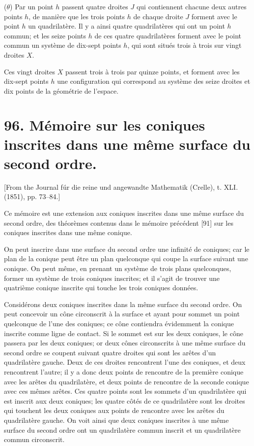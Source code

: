\documentclass[11pt,a4paper]{book}
\begin{document}
($\theta$) Par un point $h$ passent quatre droites $J$ qui contiennent chacune deux autres points $h$, de mani\`{e}re que les trois points $h$ de chaque droite $J$ forment avec le point $h$ un quadrilat\`{e}re. Il y a ainsi quatre quadrilat\`{e}res qui ont un point $h$ commun; et les seize points $h$ de ces quatre quadrilat\`{e}res forment avec le point commun un syst\`{e}me de dix-sept points $h$, qui sont situ\'{e}s trois \`{a} trois sur vingt droites $X$.

Ces vingt droites $X$ passent trois \`{a} trois par quinze points, et forment avec les dix-sept points $h$ une configuration qui correspond au syst\`{e}me des seize droites et dix points de la g\'{e}om\'{e}trie de l'espace.

\newpage

\section*{96. M\'{e}moire sur les coniques inscrites dans une m\^{e}me surface du second ordre.}

[From the Journal f\'{u}r die reine und angewandte Mathematik (Crelle), t. XLI. (1851), pp. 73--84.]

Ce m\'{e}moire est une extension aux coniques inscrites dans une m\^{e}me surface du second ordre, des th\'{e}or\`{e}mes contenus dans le m\'{e}moire pr\'{e}c\'{e}dent [91] sur les coniques inscrites dans une m\^{e}me conique.

On peut inscrire dans une surface du second ordre une infinit\'{e} de coniques; car le plan de la conique peut \^{e}tre un plan quelconque qui coupe la surface suivant une conique. On peut m\^{e}me, en prenant un syst\`{e}me de trois plans quelconques, former un syst\`{e}me de trois coniques inscrites; et il s'agit de trouver une quatri\`{e}me conique inscrite qui touche les trois coniques donn\'{e}es.

Consid\'{e}rons deux coniques inscrites dans la m\^{e}me surface du second ordre. On peut concevoir un c\^{o}ne circonscrit \`{a} la surface et ayant pour sommet un point quelconque de l'une des coniques; ce c\^{o}ne contiendra \'{e}videmment la conique inscrite comme ligne de contact. Si le sommet est sur les deux coniques, le c\^{o}ne passera par les deux coniques; or deux c\^{o}nes circonscrits \`{a} une m\^{e}me surface du second ordre se coupent suivant quatre droites qui sont les ar\^{e}tes d'un quadrilat\`{e}re gauche. Deux de ces droites rencontrent l'une des coniques, et deux rencontrent l'autre; il y a donc deux points de rencontre de la premi\`{e}re conique avec les ar\^{e}tes du quadrilat\`{e}re, et deux points de rencontre de la seconde conique avec ces m\^{e}mes ar\^{e}tes. Ces quatre points sont les sommets d'un quadrilat\`{e}re qui est inscrit aux deux coniques; les quatre c\^{o}t\'{e}s de ce quadrilat\`{e}re sont les droites qui touchent les deux coniques aux points de rencontre avec les ar\^{e}tes du quadrilat\`{e}re gauche. On voit ainsi que deux coniques inscrites \`{a} une m\^{e}me surface du second ordre ont un quadrilat\`{e}re commun inscrit et un quadrilat\`{e}re commun circonscrit.
\end{document}
